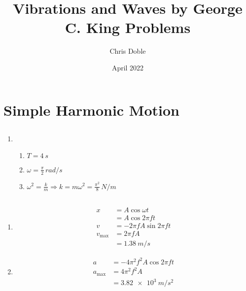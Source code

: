 \documentclass{article}
\title{Vibrations and Waves by George C. King Problems}
\author{Chris Doble}
\date{April 2022}
\begin{document}
\maketitle

\tableofcontents

\section{Simple Harmonic Motion}

\subsection{}

\begin{enumerate}
  \item

        \begin{enumerate}
          \item $T = \qty{4}{s}$

          \item $\omega = \frac{\pi}{2} \,\unit{rad/s}$

          \item $\omega^2 = \frac{k}{m} \Rightarrow k = m \omega^2 = \frac{\pi^2}{8} \,\unit{N/m}$
        \end{enumerate}
\end{enumerate}

\subsection{}

\begin{enumerate}
  \item

        \begin{align*}
          x            & = A \cos \omega t           \\
                       & = A \cos 2 \pi f t          \\
          v            & = -2 \pi f A \sin 2 \pi f t \\
          v_\text{max} & = 2 \pi f A                 \\
                       & = \qty{1.38}{m/s}
        \end{align*}

  \item

        \begin{align*}
          a            & = -4 \pi^2 f^2 A \cos 2 \pi f t \\
          a_\text{max} & = 4 \pi^2 f^2 A                 \\
                       & = \qty{3.82e3}{m/s^2}
        \end{align*}
\end{enumerate}
\end{document}
